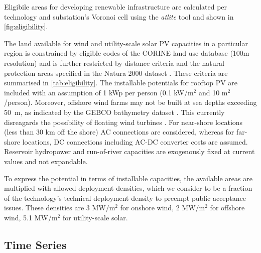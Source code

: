 Eligibile areas for developing renewable infrastructure are calculated per
technology and substation's Voronoi cell using the \textit{atlite} tool
 and shown in \cref{fig:eligibility}.

The land available for wind and utility-scale solar PV capacities in a
particular region is constrained by eligible codes of the CORINE land use
database (100m resolution)  and is
further restricted by distance criteria and the natural protection areas
specified in the Natura 2000 dataset
. These criteria are summarised in
\cref{tab:eligibility}. The installable potentials for rooftop PV are included
with an assumption of 1 kWp per person (0.1 kW/m$^2$ and 10 m$^2$/person).
Moreover, offshore wind farms may not be built at sea depths exceeding
\SI{50}{\metre}, as indicated by the GEBCO bathymetry dataset . This
currently disreagards the possibility of floating wind turbines
.
For near-shore locations (less than 30 km off the shore) AC connections are
considered, whereas for far-shore locations, DC connections including AC-DC
converter costs are assumed. Reservoir hydropower and run-of-river capacities
are exogenously fixed at current values and not expandable.

To express the potential in terms of installable capacities, the available areas
are multiplied with allowed deployment densities, which we consider to be a
fraction of the technology's technical deployment density to preempt public
acceptance issues. These densities are 3 MW/m$^ 2$ for onshore wind, 2 MW/m$^2$ for
offshore wind, 5.1 MW/m$^2$ for utility-scale solar.


\subsection{Time Series}
\label{sec:si:renewable-ts}

